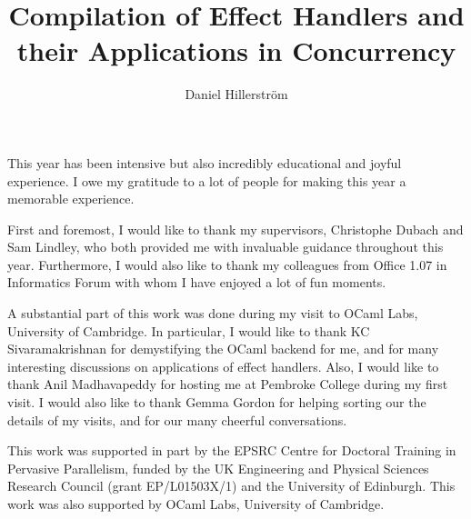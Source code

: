 \documentclass[12pt,mscres,cdtppar,twoside,openright,logo,rightchapter,normalheadings]{infthesis}
\title{Compilation of Effect Handlers and their Applications in Concurrency}
\author{Daniel Hillerström}
\theoremstyle{definition}
\begin{document}
\raggedbottom
\begin{preliminary}

\maketitle

\begin{acknowledgements}
  This year has been intensive but also incredibly educational and
  joyful experience.  I owe my gratitude to a lot of people for making
  this year a memorable experience. 

  First and foremost, I would like to thank my supervisors, Christophe
  Dubach and Sam Lindley, who both provided me with invaluable
  guidance throughout this year. Furthermore, I would also like to
  thank my colleagues from Office 1.07 in Informatics Forum with whom
  I have enjoyed a lot of fun moments.

  A substantial part of this work was done during my visit to OCaml
  Labs, University of Cambridge. In particular, I would like to thank
  KC Sivaramakrishnan for demystifying the OCaml backend for me, and
  for many interesting discussions on applications of effect
  handlers. Also, I would like to thank Anil Madhavapeddy for hosting
  me at Pembroke College during my first visit. I would also like to
  thank Gemma Gordon for helping sorting our the details of my visits,
  and for our many cheerful conversations.

  This work was supported in part by the EPSRC Centre for Doctoral
  Training in Pervasive Parallelism, funded by the UK Engineering and
  Physical Sciences Research Council (grant EP/L01503X/1) and the
  University of Edinburgh. This work was also supported by OCaml Labs,
  University of Cambridge.
\end{acknowledgements}


\end{preliminary}
\end{document}
